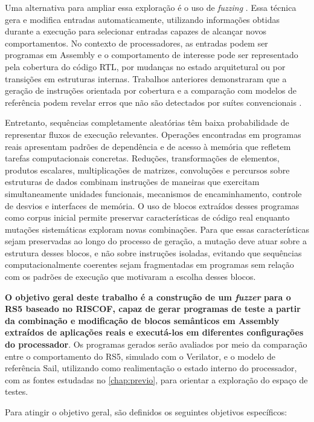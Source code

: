 Uma alternativa para ampliar essa exploração é o uso de \textit{fuzzing} \citep{Zeller:2024:FuzzingBook}. 
Essa técnica gera e modifica entradas automaticamente, utilizando informações obtidas durante a execução para selecionar entradas capazes de alcançar novos comportamentos. 
No contexto de processadores, as entradas podem ser programas em Assembly e o comportamento de interesse pode ser representado pela cobertura do código RTL, por mudanças no estado arquitetural ou por transições em estruturas internas. 
Trabalhos anteriores demonstraram que a geração de instruções orientada por cobertura e a comparação com modelos de referência podem revelar erros que não são detectados por suítes convencionais \citep{Hur:2021:DifuzzRTL,Solt:2024:Cascade,Guo:2025:DiveFuzz,Lyu:2026:SimFuzz}. 

Entretanto, sequências completamente aleatórias têm baixa probabilidade de representar fluxos de execução relevantes. 
Operações encontradas em programas reais apresentam padrões de dependência e de acesso à memória que refletem tarefas computacionais concretas. 
Reduções, transformações de elementos, produtos escalares, multiplicações de matrizes, convoluções e percursos sobre estruturas de dados combinam instruções de maneiras que exercitam simultaneamente unidades funcionais, mecanismos de encaminhamento, controle de desvios e interfaces de memória. 
O uso de blocos extraídos desses programas como corpus inicial permite preservar características de código real enquanto mutações sistemáticas exploram novas combinações. 
Para que essas características sejam preservadas ao longo do processo de geração, a mutação deve atuar sobre a estrutura desses blocos, e não sobre instruções isoladas, evitando que sequências computacionalmente coerentes sejam fragmentadas em programas sem relação com os padrões de execução que motivaram a escolha desses blocos.
 
\textbf{O objetivo geral deste trabalho é a construção de um \textit{fuzzer} para o RS5 baseado no RISCOF, capaz de gerar programas de teste a partir da combinação e modificação de blocos semânticos em Assembly extraídos de aplicações reais e executá-los em diferentes configurações do processador}. Os programas gerados serão avaliados por meio da comparação entre o comportamento do RS5, simulado com o Verilator, e o modelo de referência Sail, utilizando como realimentação o estado interno do processador, com as fontes estudadas no \cref{chap:previo}, para orientar a exploração do espaço de testes. 
 
Para atingir o objetivo geral, são definidos os seguintes objetivos específicos:
 
